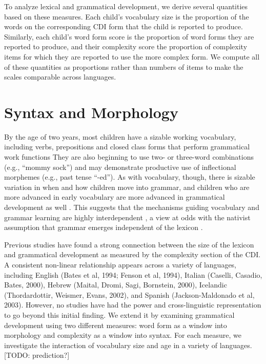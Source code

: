 \documentclass[10pt,letterpaper]{article}
\begin{document}
To analyze lexical and grammatical development, we derive several quantities based on these measures. Each child's vocabulary size is the proportion of the words on the corresponding CDI form that the child is reported to produce. Similarly, each child's word form score is the proportion of word forms they are reported to produce, and their complexity score the proportion of complexity items for which they are reported to use the more complex form. We compute all of these quantities as proportions rather than numbers of items to make the scales comparable across languages.

\section{Syntax and Morphology}

By the age of two years, most children have a sizable working vocabulary, including verbs, prepositions and closed class forms that perform grammatical work functions  They are also beginning to use two- or three-word combinations (e.g., ``mommy sock'') and may demonstrate productive use of inflectional morphemes (e.g., past tense ``-ed''). As with vocabulary, though, there is sizable variation in when and how children move into grammar, and children who are more advanced in early vocabulary are more advanced in grammatical development as well \cite{bates1999}. This suggests that the mechanisms guiding vocabulary and grammar learning are highly interdependent \cite{tomasello2003,bresnan2001}, a view at odds with the nativist assumption that grammar emerges independent of the lexicon \cite{chomsky1981}.

Previous studies have found a strong connection between the size of the lexicon and grammatical development as measured by the complexity section of the CDI. A consistent non-linear relationship appears across a variety of languages, including English (Bates et al, 1994; Fenson et al, 1994), Italian (Caselli, Casadio, Bates, 2000), Hebrew (Maital, Dromi, Sagi, Bornstein, 2000), Icelandic (Thordardottir, Weismer, Evans, 2002), and Spanish (Jackson-Maldonado et al, 2003). However, no studies have had the power and cross-linguistic representation to go beyond this initial finding. We extend it by examining grammatical development using two different measures: word form as a window into morphology and complexity as a window into syntax. For each measure, we investigate the interaction of vocabulary size and age in a variety of languages. [TODO: prediction?]
\end{document}
